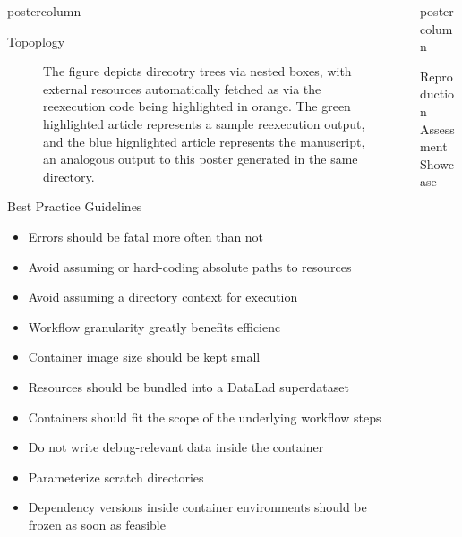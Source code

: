 \begin{frame}
\begin{columns}
\begin{column}{.42\textwidth}
\begin{beamercolorbox}[center]{postercolumn}
\begin{minipage}{.98\textwidth}
{\begin{myblock}{Topoplogy}
\begin{figure}
{								The figure depicts direcotry trees via nested boxes, with external resources automatically fetched as via the reexecution code being highlighted in orange.
								The green highlighted article represents a sample reexecution output, and the blue hignlighted article represents the manuscript, an analogous output to this poster generated in the same directory.
							}
						\end{figure}
					\end{myblock}\vfill
					\begin{myblock}{Best Practice Guidelines}
						\vspace{0.5em}
						\Large
						\begin{itemize}
							\item Errors should be fatal more often than not
							\item Avoid assuming or hard-coding absolute paths to resources
							\item Avoid assuming a directory context for execution
							\item Workflow granularity greatly benefits efficienc
							\item Container image size should be kept small
							\item Resources should be bundled into a DataLad superdataset
							\item Containers should fit the scope of the underlying workflow steps
							\item Do not write debug-relevant data inside the container
							\item Parameterize scratch directories
							\item Dependency versions inside container environments should be frozen as soon as feasible
						\end{itemize}
					\end{myblock}\vfill
		}\end{minipage}\end{beamercolorbox}
	\end{column}
	\begin{column}{.59\textwidth}
		\begin{beamercolorbox}[center]{postercolumn}
			\begin{minipage}{.98\textwidth} %
				\parbox[t][\columnheight]{\textwidth}{ %
					\begin{myblock}{Reproduction Assessment Showcase}
						\vspace{0.75em}

\end{myblock}}
\end{minipage}
\end{beamercolorbox}
\end{column}
\end{columns}
\end{frame}
